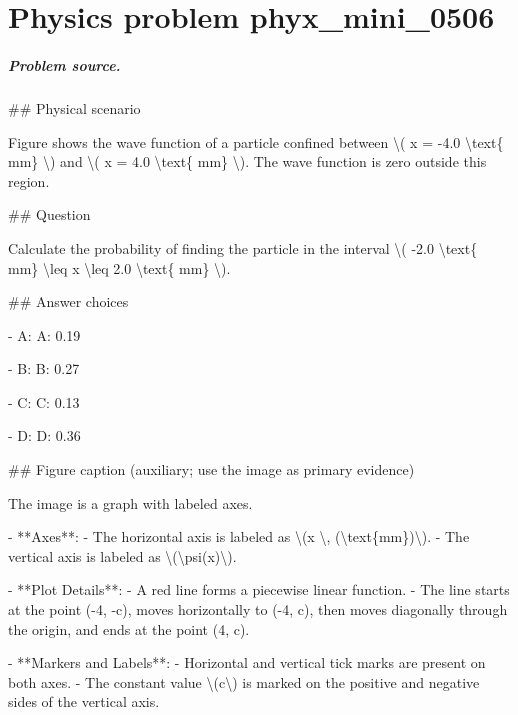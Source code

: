 
\chapter{Physics problem phyx\_mini\_0506}
\label{ch:PhyXMiniProblems_problem_phyx_mini_0506}

\paragraph{Problem source.}
\#\# Physical scenario

Figure shows the wave function of a particle confined between \textbackslash{}( x = -4.0 \textbackslash{}text\{ mm\} \textbackslash{}) and \textbackslash{}( x = 4.0 \textbackslash{}text\{ mm\} \textbackslash{}). The wave function is zero outside this region.

\#\# Question

Calculate the probability of finding the particle in the interval \textbackslash{}( -2.0 \textbackslash{}text\{ mm\} \textbackslash{}leq x \textbackslash{}leq 2.0 \textbackslash{}text\{ mm\} \textbackslash{}).

\#\# Answer choices

- A: A: 0.19

- B: B: 0.27

- C: C: 0.13

- D: D: 0.36

\#\# Figure caption (auxiliary; use the image as primary evidence)

The image is a graph with labeled axes. 

- **Axes**:
  - The horizontal axis is labeled as \textbackslash{}(x \textbackslash{}, (\textbackslash{}text\{mm\})\textbackslash{}).
  - The vertical axis is labeled as \textbackslash{}(\textbackslash{}psi(x)\textbackslash{}).

- **Plot Details**:
  - A red line forms a piecewise linear function.
  - The line starts at the point (-4, -c), moves horizontally to (-4, c), then moves diagonally through the origin, and ends at the point (4, c).

- **Markers and Labels**:
  - Horizontal and vertical tick marks are present on both axes.
  - The constant value \textbackslash{}(c\textbackslash{}) is marked on the positive and negative sides of the vertical axis.

